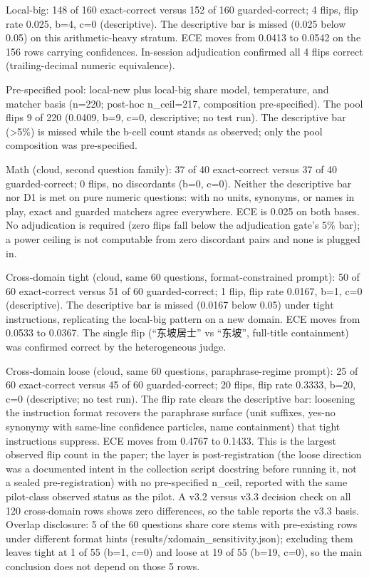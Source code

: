 \documentclass[10pt]{article} %
\begin{document}
Local-big: 148 of 160 exact-correct versus 152 of 160 guarded-correct; 4 flips, flip rate 0.025, b=4, c=0 (descriptive). The descriptive bar is missed (0.025 below 0.05) on this arithmetic-heavy stratum. ECE moves from 0.0413 to 0.0542 on the 156 rows carrying confidences. In-session adjudication confirmed all 4 flips correct (trailing-decimal numeric equivalence).

Pre-specified pool: local-new plus local-big share model, temperature, and matcher basis (n=220; post-hoc n\_ceil=217, composition pre-specified). The pool flips 9 of 220 (0.0409, b=9, c=0, descriptive; no test run). The descriptive bar (>5\%) is missed while the b-cell count stands as observed; only the pool composition was pre-specified.

Math (cloud, second question family): 37 of 40 exact-correct versus 37 of 40 guarded-correct; 0 flips, no discordants (b=0, c=0). Neither the descriptive bar nor D1 is met on pure numeric questions: with no units, synonyms, or names in play, exact and guarded matchers agree everywhere. ECE is 0.025 on both bases. No adjudication is required (zero flips fall below the adjudication gate's 5\% bar); a power ceiling is not computable from zero discordant pairs and none is plugged in.

Cross-domain tight (cloud, same 60 questions, format-constrained prompt): 50 of 60 exact-correct versus 51 of 60 guarded-correct; 1 flip, flip rate 0.0167, b=1, c=0 (descriptive). The descriptive bar is missed (0.0167 below 0.05) under tight instructions, replicating the local-big pattern on a new domain. ECE moves from 0.0533 to 0.0367. The single flip (``东坡居士'' vs ``东坡'', full-title containment) was confirmed correct by the heterogeneous judge.

Cross-domain loose (cloud, same 60 questions, paraphrase-regime prompt): 25 of 60 exact-correct versus 45 of 60 guarded-correct; 20 flips, flip rate 0.3333, b=20, c=0 (descriptive; no test run). The flip rate clears the descriptive bar: loosening the instruction format recovers the paraphrase surface (unit suffixes, yes-no synonymy with same-line confidence particles, name containment) that tight instructions suppress. ECE moves from 0.4767 to 0.1433. This is the largest observed flip count in the paper; the layer is post-registration (the loose direction was a documented intent in the collection script docstring before running it, not a sealed pre-registration) with no pre-specified n\_ceil, reported with the same pilot-class observed status as the pilot. A v3.2 versus v3.3 decision check on all 120 cross-domain rows shows zero differences, so the table reports the v3.3 basis. Overlap disclosure: 5 of the 60 questions share core stems with pre-existing rows under different format hints (results/xdomain\_sensitivity.json); excluding them leaves tight at 1 of 55 (b=1, c=0) and loose at 19 of 55 (b=19, c=0), so the main conclusion does not depend on those 5 rows.
\end{document}
